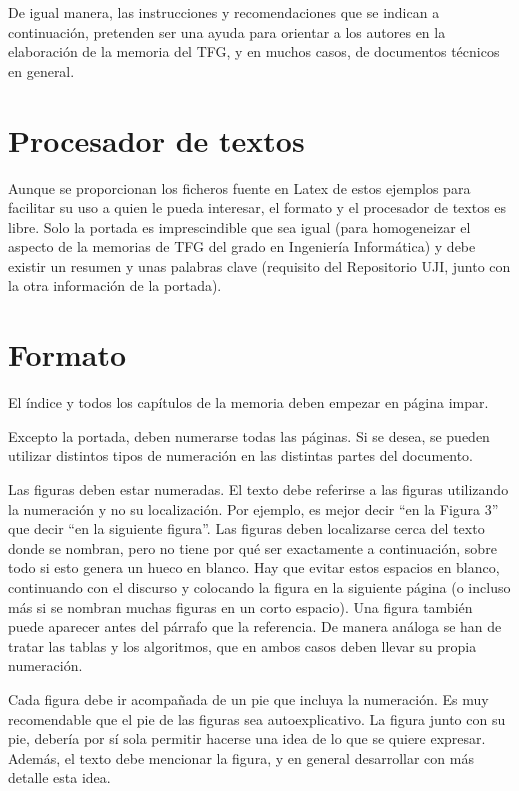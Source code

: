 \documentclass[pdftex,11pt,a4paper]{book}
\begin{document}
De igual manera, las instrucciones y recomendaciones que se indican a continuación, pretenden ser una ayuda para orientar a los autores en la elaboración de la memoria del TFG, y en muchos casos, de documentos técnicos en general. 

\section*{Procesador de textos}

Aunque se proporcionan los ficheros fuente en Latex de estos ejemplos para facilitar su uso a quien le pueda interesar, el formato y el procesador de textos es libre. Solo la portada es imprescindible que sea igual (para homogeneizar el aspecto de la memorias de TFG del grado en Ingeniería Informática) y debe existir un resumen y unas palabras clave (requisito del Repositorio UJI, junto con la otra información de la portada).  

\section*{Formato}

El índice y todos los capítulos de la memoria deben empezar en página impar. 

Excepto la portada, deben numerarse todas las páginas. Si se desea, se pueden utilizar distintos tipos de numeración en las distintas partes del documento.

Las figuras deben estar numeradas. El texto debe referirse a las figuras utilizando la numeración y no su localización. Por ejemplo, es mejor decir ``en la Figura 3'' que decir ``en la siguiente figura''. Las figuras deben localizarse cerca del texto donde se nombran, pero no tiene por qué ser exactamente a continuación, sobre todo si esto genera un hueco en blanco. 
Hay que evitar estos espacios en blanco, continuando con el discurso y colocando la figura en la siguiente página 
(o incluso más si se nombran muchas figuras en un corto espacio). Una figura también puede aparecer antes del párrafo que la referencia. De manera análoga se han de tratar las tablas y los algoritmos, que en ambos casos deben llevar su propia numeración. 

Cada figura debe ir acompañada de un pie que incluya la numeración. Es muy recomendable que el pie de las figuras sea autoexplicativo. La figura junto con su pie, debería por sí sola permitir hacerse una idea de lo que se quiere expresar. Además, el texto debe mencionar la figura, y en general desarrollar con más detalle esta idea. 
\end{document}
